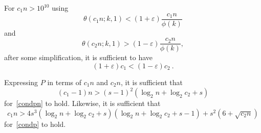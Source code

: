 For $c_1n>10^{10}$ using \[\theta(c_1n;k,1) < (1+\varepsilon)
\frac{c_1n}{\phi(k)}
\]
and \[\theta(c_2n;k,1) > (1-\varepsilon)\frac{c_2n}{\phi(k)},
\] after some simplification, it is sufficient to have
\begin{equation}\label{cond1a}
(1+\varepsilon)c_1 < (1-\varepsilon)c_2~.
\end{equation}

 Expressing $P$ in terms of $c_1n$ and $c_2n$, it is
sufficient that
\begin{equation}\label{cond2}
(c_1-1)n > (s-1)^2(\log_2n+\log_2c_2+s)
\end{equation}
for~\eqref{condpn} to hold. Likewise, it is sufficient that
\begin{equation}\label{cond3}
c_1n>4s^3(\log_2n+\log_2c_2+s)(\log_2n+\log_2c_2+s-1)+s^2(6+\sqrt{c_2n})
\end{equation}
for~\eqref{condp} to hold.




